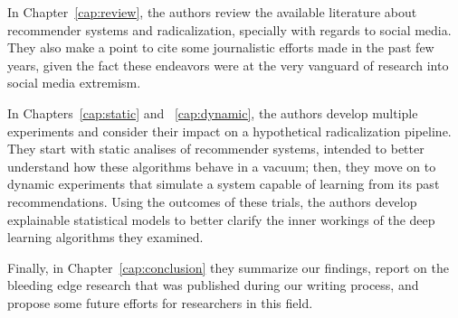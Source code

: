 In Chapter~\ref{cap:review}, the authors review the available literature about
recommender systems and radicalization, specially with regards to social media.
They also make a point to cite some journalistic efforts made in the past few
years, given the fact these endeavors were at the very vanguard of research into
social media extremism.

In Chapters~\ref{cap:static} and ~\ref{cap:dynamic}, the authors develop
multiple experiments and consider their impact on a hypothetical radicalization
pipeline. They start with static analises of recommender systems, intended to
better understand how these algorithms behave in a vacuum; then, they move on to
dynamic experiments that simulate a system capable of learning from its past
recommendations. Using the outcomes of these trials, the authors develop
explainable statistical models to better clarify the inner workings of the deep
learning algorithms they examined.

Finally, in Chapter~\ref{cap:conclusion} they summarize our findings, report on
the bleeding edge research that was published during our writing process, and
propose some future efforts for researchers in this field.
